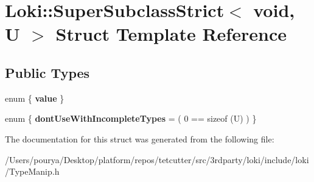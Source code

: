 \hypertarget{structLoki_1_1SuperSubclassStrict_3_01void_00_01U_01_4}{}\section{Loki\+:\+:Super\+Subclass\+Strict$<$ void, U $>$ Struct Template Reference}
\label{structLoki_1_1SuperSubclassStrict_3_01void_00_01U_01_4}
\subsection*{Public Types}
\begin{DoxyCompactItemize}
\item 
\hypertarget{structLoki_1_1SuperSubclassStrict_3_01void_00_01U_01_4_ae3705918274bce96fe999bb52200d9b1}{}enum \{ {\bfseries value}
 \}\label{structLoki_1_1SuperSubclassStrict_3_01void_00_01U_01_4_ae3705918274bce96fe999bb52200d9b1}

\item 
\hypertarget{structLoki_1_1SuperSubclassStrict_3_01void_00_01U_01_4_a7c11c59bc6a630040e1ca66b4deee1d1}{}enum \{ {\bfseries dont\+Use\+With\+Incomplete\+Types} = ( 0 == sizeof (U) )
 \}\label{structLoki_1_1SuperSubclassStrict_3_01void_00_01U_01_4_a7c11c59bc6a630040e1ca66b4deee1d1}

\end{DoxyCompactItemize}


The documentation for this struct was generated from the following file\+:\begin{DoxyCompactItemize}
\item 
/\+Users/pourya/\+Desktop/platform/repos/tetcutter/src/3rdparty/loki/include/loki/Type\+Manip.\+h\end{DoxyCompactItemize}
